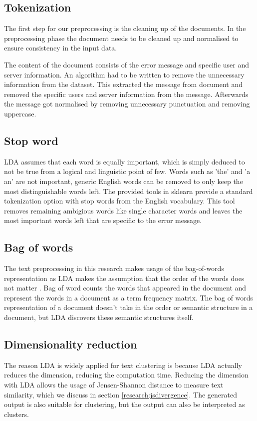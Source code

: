 \subsection{Tokenization}\label{methodology:tokenization}
The first step for our preprocessing is the cleaning up of the documents. 
In the preprocessing phase the document needs to be cleaned up and normalised to ensure consistency in the input data.

The content of the document consists of the error message and specific user and server information. An algorithm had to be written to remove the unnecessary information from the dataset. This extracted the message from document and removed the specific users and server information from the message. Afterwards the message got normalised by removing unnecessary punctuation and removing uppercase.

\subsection{Stop word}\label{methodology:stop_words}
LDA assumes that each word is equally important, which is simply deduced to not be true from a logical and linguistic point of few. Words such as 'the' and 'a\\an' are not important, generic English words can be removed to only keep the most distinguishable words left. The provided tools in sklearn provide a standard tokenization option with stop words from the English vocabulary. This tool removes remaining ambigious words like single character words and leaves the most important words left that are specific to the error message.

\subsection{Bag of words} \label{methodology:bagow}
The text preprocessing in this research makes usage of the bag-of-words representation as LDA makes the assumption that the order of the words does not matter \cite{Blei2010}. Bag of word counts the words that appeared in the document and represent the words in a document as a term frequency matrix. The bag of words representation of a document doesn't take in the order or semantic structure in a document, but LDA discovers these semantic structures itself. 

\subsection{Dimensionality reduction} \label{methodology:dimreduction}
The reason LDA is widely applied for text clustering is because LDA actually reduces the dimension, reducing the computation time. Reducing the dimension with LDA allows the usage of Jensen-Shannon distance to measure text similarity, which we discuss in section \ref{research:jsdivergence}. The generated output is also suitable for clustering, but the output can also be interpreted as clusters.

